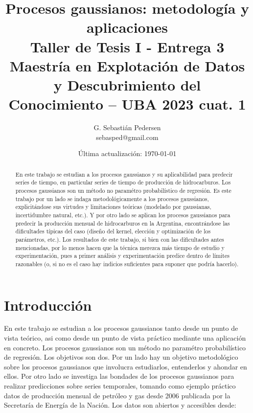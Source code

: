 \documentclass[a4paper]{article}
\title{Procesos gaussianos: metodología y aplicaciones\\ Taller de Tesis I - Entrega 3\\ Maestría en Explotación de Datos y Descubrimiento del Conocimiento -- UBA 2023 cuat. 1}%
\author{G. Sebastián Pedersen \\ {\small sebasped@gmail.com}}
\date{Última actualización: \today}
\begin{document}

	
\maketitle


	\begin{abstract}
		En este trabajo se estudian a los procesos gaussianos y su aplicabilidad para predecir series de tiempo, en particular series de tiempo de producción de hidrocarburos. Los procesos gaussianos son un método no paramétro probabilístico de regresión. Es este trabajo por un lado se indaga metodológicamente a los procesos gaussianos, explicitándose sus virtudes y limitaciones teóricas (modelado por gaussianas, incertidumbre natural, etc.). Y por otro lado se aplican los procesos gaussianos para predecir la producción mensual de hidrocarburos en la Argentina, encontrándose las dificultades típicas del caso (diseño del kernel, elección y optimización de los parámetros, etc.). Los resultados de este trabajo, si bien con las dificultades antes mencionadas, por lo menos hacen que la técnica merezca más tiempo de estudio y experimentación, pues a primer análisis y experimentación predice dentro de límites razonables (o, si no es el caso hay indicios suficientes para suponer que podría hacerlo).
	\end{abstract}

	\tableofcontents



\section{Introducción}
\label{sec:introd}

En este trabajo se estudian a los procesos gaussianos tanto desde un punto de vista teórico, asi como desde un punto de vista práctico mediante una aplicación en concreto. Los procesos gaussianos son un método no paramétro probabilístico de regresión. Los objetivos son dos. Por un lado hay un objetivo metodológico sobre los procesos gaussianos que involucra estudiarlos, entenderlos y ahondar en ellos. Por otro lado se investiga las bondades de los procesos gaussianos para realizar predicciones sobre series temporales, tomando como ejemplo práctico datos de producción mensual de petróleo y gas desde 2006 publicada por la Secretaría de Energía de la Nación. Los datos son abiertos y accesibles desde:\\
\end{document}
